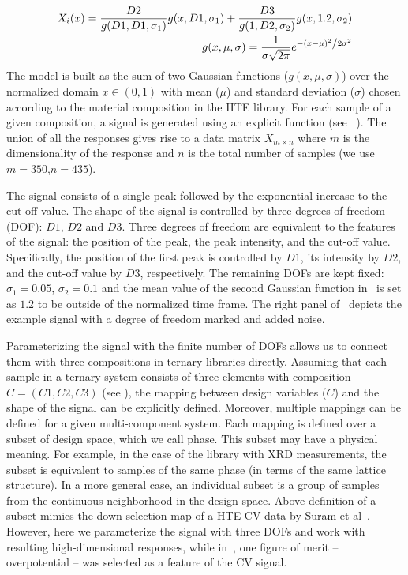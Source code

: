 \begin{equation}
\begin{split}
X_i(x)=\frac{D2}{g(D1,D1,\sigma_1)} g(x,D1,\sigma_1) + \frac{D3}{g(1,D2,\sigma_2)} g(x,1.2,\sigma_2) \\
g(x,\mu,\sigma)= \frac{1}{{\sigma \sqrt {2\pi } }}e^{{{ - \left( {x - \mu } \right)^2 } \mathord{\left/ {\vphantom {{ - \left( {x - \mu } \right)^2 } {2\sigma^2 }}} \right. \kern-\nulldelimiterspace} {2\sigma ^2 }}}
\end{split}
    \label{eqGauss}
\end{equation}
The model is built as the sum of two Gaussian functions ($g(x,\mu,\sigma)$) over the normalized domain $x\in(0,1)$ with mean ($\mu$) and standard deviation ($\sigma$) chosen according to the material composition in the HTE library. 
For each sample of a given composition, a signal is generated using an explicit function (see ~). 
The union of all the responses gives rise to a data matrix $X_{m\times n}$ where $m$ is the dimensionality of the response and $n$ is the total number of samples (we use $m=350$,$n=435$). 

The signal consists of a single peak followed by the exponential increase to the cut-off value. 
The shape of the signal is controlled by three degrees of freedom (DOF): $D1$, $D2$ and $D3$. 
Three degrees of freedom are equivalent to the features of the signal: the position of the peak, the peak intensity, and the cut-off value.
Specifically, the position of the first peak is controlled by $D1$, its intensity by $D2$, and the cut-off value by $D3$, respectively.
The remaining DOFs are kept fixed: $\sigma_1=0.05$, $\sigma_2=0.1$ and the mean value of the second Gaussian function in~ is set as $1.2$ to be outside of the normalized time frame. 
The right panel of~ depicts the example signal with a degree of freedom marked and added noise. 

Parameterizing the signal with the finite number of DOFs allows us to connect them with three compositions in ternary libraries directly. 
Assuming that each sample in a ternary system consists of three elements with composition $C = (C1,C2,C3)$ (see ), the mapping between design variables ($C$) and the shape of the signal can be explicitly defined. 
Moreover, multiple mappings can be defined for a given multi-component system. 
Each mapping is defined over a subset of design space, which we call phase. 
This subset may have a physical meaning. 
For example, in the case of the library with XRD measurements, the subset is equivalent to samples of the same phase (in terms of the same lattice structure). 
In a more general case, an individual subset is a group of samples from the continuous neighborhood in the design space.
Above definition of a subset mimics the down selection map of a HTE CV data by Suram et al~\cite{suram2015generating}. 
However, here we parameterize the signal with three DOFs and work with resulting high-dimensional responses, while in~\cite{suram2015generating}, one figure of merit -- overpotential -- was selected as a feature of the CV signal. 

